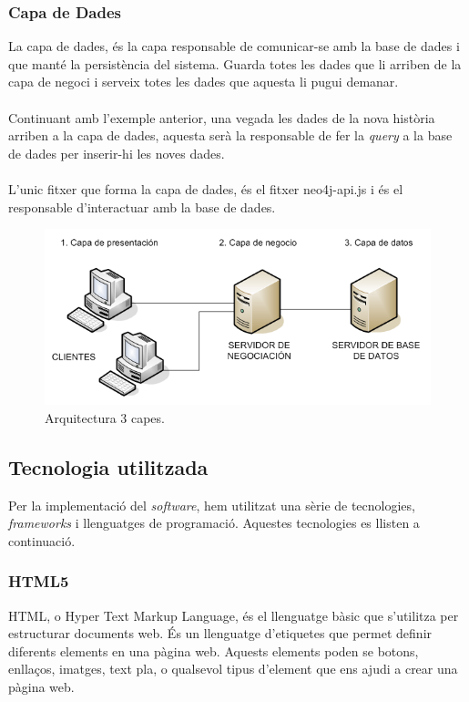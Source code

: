\documentclass[11pt,catalan,listoffigures,listoftables]{tfgetsinf}
\begin{document}
\subsubsection{Capa de Dades}

La capa de dades, és la capa responsable de comunicar-se amb la base de dades i que manté la persistència del sistema. Guarda totes les dades que li arriben de la capa de negoci i serveix totes les dades que aquesta li pugui demanar.\\ \\
Continuant amb l'exemple anterior, una vegada les dades de la nova història arriben a la capa de dades, aquesta serà la responsable de fer la \textit{query} a la base de dades per inserir-hi les noves dades.\\ \\
L'unic fitxer que forma la capa de dades, és el fitxer neo4j-api.js i és el responsable d'interactuar amb la base de dades.

\begin{figure}[h]
\includegraphics[width=15cm]{images/image12}
\centering
\caption[Figura 4.1]{Arquitectura 3 capes.}
\centering
\end{figure}
\newpage
\subsection{Tecnologia utilitzada}
Per la implementació del \textit{software}, hem utilitzat una sèrie de tecnologies, \textit{frameworks} i llenguatges de programació. Aquestes tecnologies es llisten a continuació.

\subsubsection{HTML5}

HTML, o Hyper Text Markup Language, és el llenguatge bàsic que s'utilitza per estructurar documents web. És un llenguatge d'etiquetes que permet definir diferents elements en una pàgina web. Aquests elements poden se botons, enllaços, imatges, text pla, o qualsevol tipus d'element que ens ajudi a crear una pàgina web.
\end{document}
